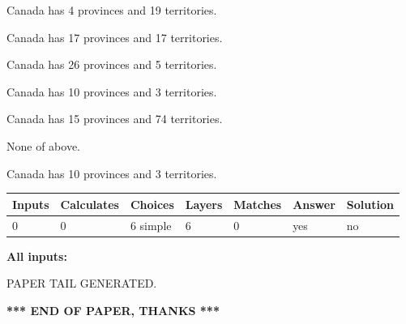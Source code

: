 \documentclass[12pt]{article}
\begin{document}
 
Canada has   4 provinces and  19 territories.
 
 
Canada has  17 provinces and  17 territories.
 
 
Canada has  26 provinces and  5 territories.
 
 
Canada has 10  provinces and 3 territories.
 
 
Canada has  15 provinces and  74 territories.
 
 
 None of above.
 
 
\noindent{}
 
 
Canada has 10  provinces and 3 territories.
 
 
\noindent{}
 
 
   
   
   
   
\noindent\begin{tabular}{|l|l|l|l|l|l|l|}
 \hline
Inputs & Calculates & Choices & Layers & Matches & Answer & Solution \\ \hline
 0  & 
 0  & 
 6
  simple  
  & 
 6  & 
 0  & 
  yes & 
  no 
  \\ \hline
 \end{tabular}
   
   
   
   
\noindent{}
   
   
   
   
\noindent\vspace{0.1in}\hspace{-0.08in} {\textbf{\Large{All inputs: }}}
   
   
   
   
   
   
 \vspace{0.2in}
 
   
   
\vspace{2.0in} PAPER TAIL GENERATED.
   
   
   
   
\vspace{1.0in} 
{\textbf{\large{ *** END OF PAPER, THANKS *** }}} 
   
\end{document}
